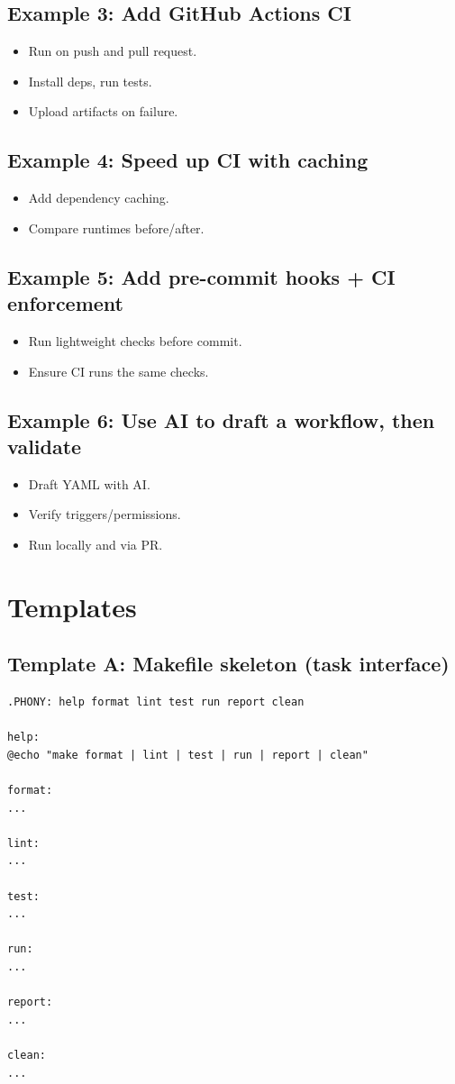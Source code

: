 \subsection{Example 3: Add GitHub Actions CI}
\begin{itemize}
\item Run on push and pull request.
\item Install deps, run tests.
\item Upload artifacts on failure.
\end{itemize}

\subsection{Example 4: Speed up CI with caching}
\begin{itemize}
\item Add dependency caching.
\item Compare runtimes before/after.
\end{itemize}

\subsection{Example 5: Add pre-commit hooks + CI enforcement}
\begin{itemize}
\item Run lightweight checks before commit.
\item Ensure CI runs the same checks.
\end{itemize}

\subsection{Example 6: Use AI to draft a workflow, then validate}
\begin{itemize}
\item Draft YAML with AI.
\item Verify triggers/permissions.
\item Run locally and via PR.
\end{itemize}

\section{Templates}
\subsection{Template A: Makefile skeleton (task interface)}
\begin{verbatim}
.PHONY: help format lint test run report clean

help:
@echo "make format | lint | test | run | report | clean"

format:
...

lint:
...

test:
...

run:
...

report:
...

clean:
...
\end{verbatim}

